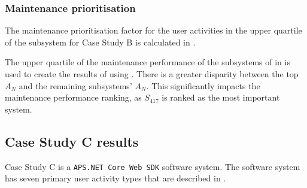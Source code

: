 \clearpage

\subsubsection{Maintenance prioritisation}
The maintenance prioritisation factor for the user activities in the upper quartile of the subsystem for Case Study B is calculated in .



The upper quartile of the maintenance performance of the subsystems of  in  is used to create the results of  using . There is a greater disparity between the top $A_N$ and the remaining subsystems' $A_N$. This significantly impacts the maintenance performance ranking, as $S_{417}$ is ranked as the most important system.

\clearpage

\subsection{Case Study C results}\label{sec:ch3_csC}
Case Study C is a \texttt{APS.NET Core Web SDK} software system. The software system has seven primary user activity types that are described in .

